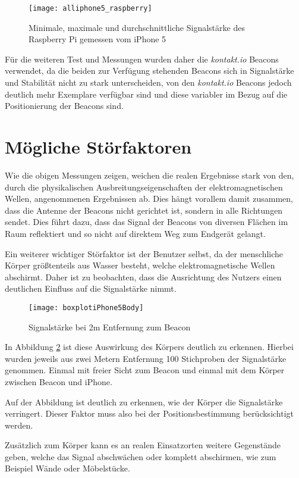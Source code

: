 \begin{figure}[htb!]
		\centering
	\texttt{[image: alliphone5\_raspberry]}
	\caption{Minimale, maximale und durchschnittliche Signalstärke des Raspberry Pi gemessen vom iPhone 5}
	\label{alliphone5_raspberry}
\end{figure}

Für die weiteren Test und Messungen wurden daher die \emph{kontakt.io} Beacons verwendet, da die beiden zur Verfügung stehenden Beacons sich in Signalstärke und Stabilität nicht zu stark unterscheiden, von den \emph{kontakt.io} Beacons jedoch deutlich mehr Exemplare verfügbar sind und diese variabler im Bezug auf die Positionierung der Beacons sind.


\section{Mögliche Störfaktoren}
\label{sec:dataandmeasurement:interferencefactor}
Wie die obigen Messungen zeigen, weichen die realen Ergebnisse stark von den, durch die physikalischen Ausbreitungseigenschaften der elektromagnetischen Wellen, angenommenen Ergebnissen ab. Dies hängt vorallem damit zusammen, dass die Antenne der Beacons nicht gerichtet ist, sondern in alle Richtungen sendet. Dies führt dazu, dass das Signal der Beacons von diversen Flächen im Raum reflektiert und so nicht auf direktem Weg zum Endgerät gelangt. 

Ein weiterer wichtiger Störfaktor ist der Benutzer selbst, da der menschliche Körper größtenteils aus Wasser besteht, welche elektromagnetische Wellen abschirmt. Daher ist zu beobachten, dass die Ausrichtung des Nutzers einen deutlichen Einfluss auf die Signalstärke nimmt. 

\begin{figure}[htb!]
		\centering
	\texttt{[image: boxplotiPhone5Body]}
	\caption{Signalstärke bei 2m Entfernung zum Beacon}
	\label{boxplotiPhone5Body}
\end{figure}

In Abbildung \ref{boxplotiPhone5Body} ist diese Auswirkung des Körpers deutlich zu erkennen. Hierbei wurden jeweils aus zwei Metern Entfernung 100 Stichproben der Signalstärke genommen. Einmal mit freier Sicht zum Beacon und einmal mit dem Körper zwischen Beacon und iPhone. 

Auf der Abbildung ist deutlich zu erkennen, wie der Körper die Signalstärke verringert. Dieser Faktor muss also bei der Positionsbestimmung berücksichtigt werden.

Zusätzlich zum Körper kann es an realen Einsatzorten weitere Gegenstände geben, welche das Signal abschwächen oder komplett abschirmen, wie zum Beispiel Wände oder Möbelstücke.